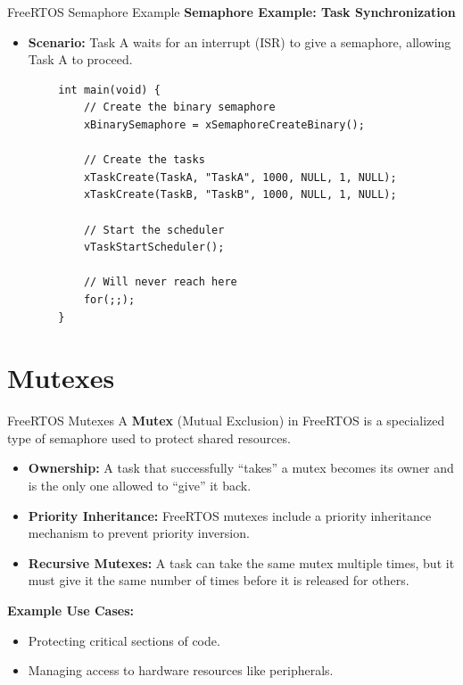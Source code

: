 \documentclass[10pt]{beamer}
\begin{document}
\begin{frame}[fragile]{FreeRTOS Semaphore Example}
    \textbf{Semaphore Example: Task Synchronization}
    \begin{itemize}
        \item \textbf{Scenario:} Task A waits for an interrupt (ISR) to give a semaphore, allowing Task A to proceed.
    \end{itemize}

    \begin{lstlisting}
        int main(void) {
            // Create the binary semaphore
            xBinarySemaphore = xSemaphoreCreateBinary();
        
            // Create the tasks
            xTaskCreate(TaskA, "TaskA", 1000, NULL, 1, NULL);
            xTaskCreate(TaskB, "TaskB", 1000, NULL, 1, NULL);
        
            // Start the scheduler
            vTaskStartScheduler();
        
            // Will never reach here
            for(;;);
        }
    \end{lstlisting}
\end{frame}

\section{Mutexes}
\begin{frame}{FreeRTOS Mutexes}
    A \textbf{Mutex} (Mutual Exclusion) in FreeRTOS is a specialized type of semaphore used to protect shared resources.
    
    \begin{itemize}
        \item \textbf{Ownership:} A task that successfully “takes” a mutex becomes its owner and is the only one allowed to “give” it back.
        \item \textbf{Priority Inheritance:} FreeRTOS mutexes include a priority inheritance mechanism to prevent priority inversion.
        \item \textbf{Recursive Mutexes:} A task can take the same mutex multiple times, but it must give it the same number of times before it is released for others.
    \end{itemize}
    
    \textbf{Example Use Cases:}
    \begin{itemize}
        \item Protecting critical sections of code.
        \item Managing access to hardware resources like peripherals.
    \end{itemize}
\end{frame}
\end{document}
